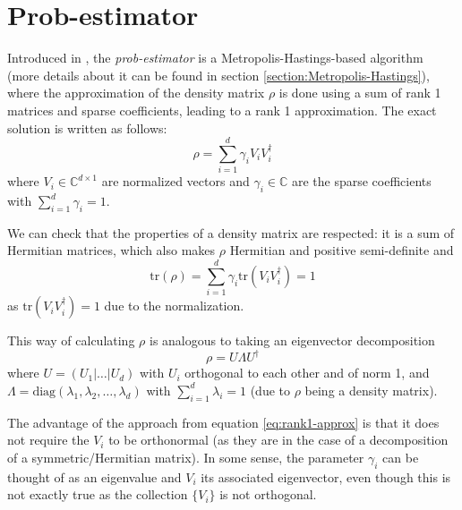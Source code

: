 \documentclass[12pt]{memoir}
\newcommand{\tr}{\text{tr}}
\begin{document}
\section{Prob-estimator}
Introduced in \cite{MA17}, the \textit{prob-estimator} is a Metropolis-Hastings-based algorithm (more details about it can be found in section \ref{section:Metropolis-Hastings}), where the approximation of the density matrix $\rho$ is done using a sum of rank 1 matrices and sparse coefficients, leading to a rank 1 approximation. The exact solution is written as follows:
\begin{equation}\label{eq:rank1-approx}
    \rho = \sum_{i=1}^d \gamma_i V_i V_i^\dagger
\end{equation}
where $V_i \in \mathbb{C}^{d\times 1}$ are normalized vectors and $\gamma_i \in \mathbb{C}$ are the sparse coefficients with $\sum_{i=1}^d \gamma_i = 1$.\medbreak

We can check that the properties of a density matrix are respected: it is a sum of Hermitian matrices, which also makes $\rho$ Hermitian and positive semi-definite and 
\begin{equation}
    \tr(\rho) = \sum_{i=1}^{d} \gamma_i \tr(V_i V_i^\dagger) = 1
\end{equation}
as $\tr(V_i V_i^\dagger) = 1$ due to the normalization.\medbreak

This way of calculating $\rho$ is analogous to taking an eigenvector decomposition
\begin{equation}
    \rho = U\Lambda U^\dagger
\end{equation}
where $U = (U_1|\dots|U_d)$ with $U_i$ orthogonal to each other and of norm 1, and $\Lambda = \text{diag}(\lambda_1, \lambda_2, \dots, \lambda_d)$ with $\sum_{i=1}^d \lambda_i = 1$ (due to $\rho$ being a density matrix).\medbreak

The advantage of the approach from equation \ref{eq:rank1-approx} is that it does not require the $V_i$ to be orthonormal (as they are in the case of a decomposition of a symmetric/Hermitian matrix). In some sense, the parameter $\gamma_i$ can be thought of as an eigenvalue and $V_i$ its associated eigenvector, even though this is not exactly true as the collection $\{V_i\}$ is not orthogonal. \medbreak
\end{document}
